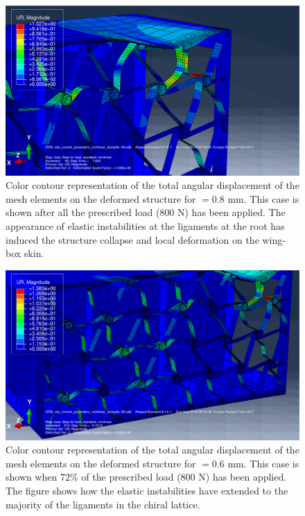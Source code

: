     \begin{figure}[!htpb] %
      \centering
      \includegraphics[width=0.8 \textwidth]{figures/../figures/result-sim/cbox/0coma8-800N-2}
      \caption[Color contour representation of the total angular displacement of the mesh elements on the deformed structure for \boxt$ = 0.8$ mm]{Color contour representation of the total angular displacement of the mesh elements on the deformed structure for \boxt$ = 0.8$ mm. This case is shown after all the prescribed load (800 N) has been applied. The appearance of elastic instabilities at the ligaments at the root has induced the structure collapse and local deformation on the wing-box skin.}\label{fig:0coma8-800N-cbox_t}
    \end{figure}

    \begin{figure}[!htpb] %
      \centering
      \includegraphics[width=0.8 \textwidth]{figures/../figures/result-sim/cbox/0coma6-800N-2}
      \caption[Color contour representation of the total angular displacement of the mesh elements on the deformed structure for \boxt$ = 0.6$ mm]{Color contour representation of the total angular displacement of the mesh elements on the deformed structure for \boxt$ = 0.6$ mm. This case is shown when 72\% of the prescribed load (800 N) has been applied. The figure shows how the elastic instabilities have extended to the majority of the ligaments in the chiral lattice.}\label{fig:0coma6-800N-cbox_t}
    \end{figure}

